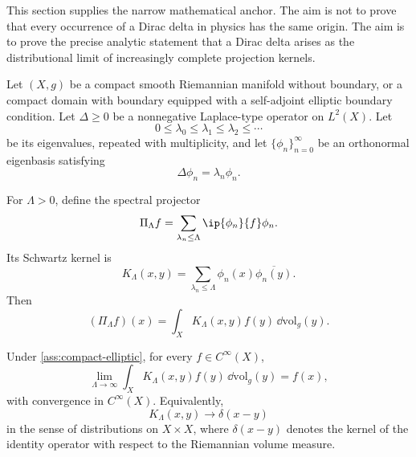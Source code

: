 \documentclass[11pt]{article}
\begin{document}
This section supplies the narrow mathematical anchor.  The aim is not to prove that every
occurrence of a Dirac delta in physics has the same origin.  The aim is to prove the
precise analytic statement that a Dirac delta arises as the distributional limit of
increasingly complete projection kernels.

\begin{assumption}\label{ass:compact-elliptic}
Let \((X,g)\) be a compact smooth Riemannian manifold without boundary, or a compact
domain with boundary equipped with a self-adjoint elliptic boundary condition. Let
\(\Delta\geq 0\) be a nonnegative Laplace-type operator on \(L^2(X)\).  Let
\[
0\leq \lambda_0\leq \lambda_1\leq \lambda_2\leq \cdots
\]
be its eigenvalues, repeated with multiplicity, and let \(\{\phi_n\}_{n=0}^\infty\) be an
orthonormal eigenbasis satisfying
\begin{equation}
\Delta \phi_n=\lambda_n\phi_n .
\end{equation}
\end{assumption}

For \(\Lambda>0\), define the spectral projector
\begin{equation}
\Pi_\Lambda f=\sum_{\lambda_n\leq \Lambda}\ip{\phi_n}{f}\phi_n .
\end{equation}
Its Schwartz kernel is
\begin{equation}
K_\Lambda(x,y)=\sum_{\lambda_n\leq \Lambda}\phi_n(x)\overline{\phi_n(y)} .
\end{equation}
Then
\begin{equation}
(\Pi_\Lambda f)(x)=\int_X K_\Lambda(x,y)f(y)\,\dd\mathrm{vol}_g(y).
\end{equation}

\begin{theorem}\label{thm:spectral-delta}
Under \cref{ass:compact-elliptic}, for every \(f\in C^\infty(X)\),
\begin{equation}
\lim_{\Lambda\to\infty}\int_X K_\Lambda(x,y)f(y)\,\dd\mathrm{vol}_g(y)=f(x),
\end{equation}
with convergence in \(C^\infty(X)\).  Equivalently,
\begin{equation}
K_\Lambda(x,y)\longrightarrow \delta(x-y)
\end{equation}
in the sense of distributions on \(X\times X\), where \(\delta(x-y)\) denotes the kernel
of the identity operator with respect to the Riemannian volume measure.
\end{theorem}
\end{document}
